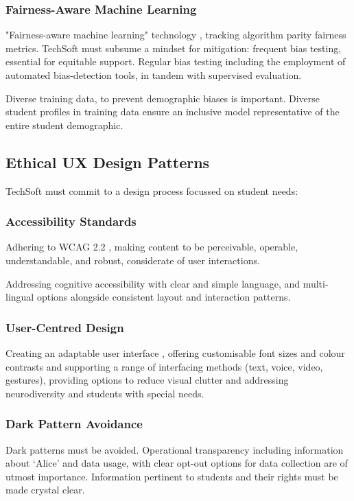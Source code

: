 \documentclass[14pt,a4paper]{article}
\begin{document}
\begin{multicols}{2}
 \subsubsection*{Fairness-Aware Machine Learning}
"Fairness-aware machine learning" technology \textit{\parencite{Barocas2021}}, tracking algorithm parity fairness metrics.
    TechSoft must subsume a mindset for mitigation: frequent bias testing, essential for equitable support.
Regular bias testing \textit{\parencite{ACMFAccT2024}} including the employment of automated bias-detection tools, in tandem with supervised evaluation.

Diverse training data, to prevent demographic biases \textit{\parencite[pp. 1-35]{Mehrabi2023}} is important. Diverse student profiles in training data ensure an inclusive model representative of the entire student demographic.


\subsection{Ethical UX Design Patterns}
TechSoft must commit to a design process focussed on student needs:

\subsubsection{Accessibility Standards}
Adhering to WCAG 2.2 \textit{\parencite{W3C2023}}, making content to be perceivable, operable, understandable, and robust, considerate of user interactions.

Addressing cognitive accessibility \textit{\parencite[pp. 1-10]{Yesilada2023}} with clear and simple language, and multi-lingual options \textit{\parencite[pp. 50-100]{AnastasiouSchaler2023}} alongside consistent layout and interaction patterns.

\subsubsection{User-Centred Design}
Creating an adaptable user interface \textit{\parencite[pp. 20-50]{HarperYesilada2024}}, offering customisable font sizes and colour contrasts and supporting a range of interfacing methods (text, voice, video, gestures), providing options to reduce visual clutter and addressing neurodiversity \textit{\parencite[pp. 30-60]{Armstrong2023}} and students with special needs.

\subsubsection{Dark Pattern Avoidance}
Dark patterns \textit{\parencite{Brignull2023}} must be avoided.
Operational transparency including information about `Alice' and data usage, with clear opt-out options for data collection are of utmost importance. Information pertinent to students and their rights must be made crystal clear.


\end{multicols}
\end{document}
